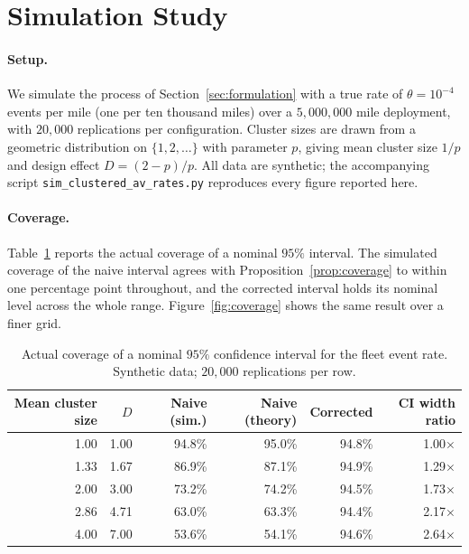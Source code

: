 \documentclass[11pt]{article}
\begin{document}
\section{Simulation Study}
\label{sec:simulation}

\paragraph{Setup.} We simulate the process of Section~\ref{sec:formulation} with a
true rate of $\theta = 10^{-4}$ events per mile (one per ten thousand miles) over
a $5{,}000{,}000$ mile deployment, with $20{,}000$ replications per configuration.
Cluster sizes are drawn from a geometric distribution on $\{1,2,\dots\}$ with
parameter $p$, giving mean cluster size $1/p$ and design effect $D = (2-p)/p$. All
data are synthetic; the accompanying script \texttt{sim\_clustered\_av\_rates.py}
reproduces every figure reported here.

\paragraph{Coverage.} Table~\ref{tab:coverage} reports the actual coverage of a
nominal $95\%$ interval. The simulated coverage of the naive interval agrees with
Proposition~\ref{prop:coverage} to within one percentage point throughout, and the
corrected interval holds its nominal level across the whole range.
Figure~\ref{fig:coverage} shows the same result over a finer grid.

\begin{table}[htbp]
\centering
\caption{Actual coverage of a nominal $95\%$ confidence interval for the fleet
event rate. Synthetic data; $20{,}000$ replications per row.}
\label{tab:coverage}
\begin{tabular}{rrrrrr}
\toprule
Mean cluster size & $D$ & Naive (sim.) & Naive (theory) & Corrected & CI width ratio \\
\midrule
1.00 & 1.00 & 94.8\% & 95.0\% & 94.8\% & 1.00$\times$ \\
1.33 & 1.67 & 86.9\% & 87.1\% & 94.9\% & 1.29$\times$ \\
2.00 & 3.00 & 73.2\% & 74.2\% & 94.5\% & 1.73$\times$ \\
2.86 & 4.71 & 63.0\% & 63.3\% & 94.4\% & 2.17$\times$ \\
4.00 & 7.00 & 53.6\% & 54.1\% & 94.6\% & 2.64$\times$ \\
\bottomrule
\end{tabular}
\end{table}
\end{document}
